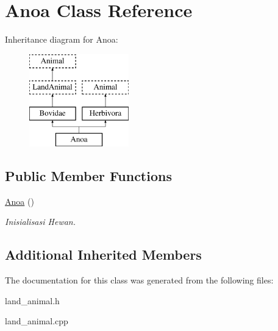 \hypertarget{class_anoa}{}\section{Anoa Class Reference}
\label{class_anoa}
Inheritance diagram for Anoa\+:\begin{figure}[H]
\begin{center}
\leavevmode
\includegraphics[height=4.000000cm]{class_anoa}
\end{center}
\end{figure}
\subsection*{Public Member Functions}
\begin{DoxyCompactItemize}
\item 
\hyperlink{class_anoa_adc03b4c166e61ef3c66c84bb9f74d037}{Anoa} ()\hypertarget{class_anoa_adc03b4c166e61ef3c66c84bb9f74d037}{}\label{class_anoa_adc03b4c166e61ef3c66c84bb9f74d037}

\begin{DoxyCompactList}\small\item\em Inisialisasi Hewan. \end{DoxyCompactList}\end{DoxyCompactItemize}
\subsection*{Additional Inherited Members}


The documentation for this class was generated from the following files\+:\begin{DoxyCompactItemize}
\item 
land\+\_\+animal.\+h\item 
land\+\_\+animal.\+cpp\end{DoxyCompactItemize}
